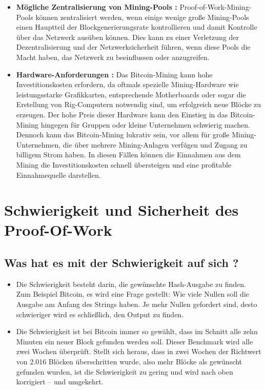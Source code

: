 \documentclass[ngerman]{scrreprt}
\begin{document}
\begin{itemize}
	\item \textbf{Mögliche Zentralisierung von Mining-Pools :} Proof-of-Work-Mining-Pools können zentralisiert werden, wenn einige wenige große Mining-Pools einen Hauptteil der Blockgenerierungsrate kontrollieren und damit Kontrolle über das Netzwerk ausüben können.  Dies kann zu einer Verletzung der Dezentralisierung und der Netzwerksicherheit führen, wenn diese Pools die Macht haben, das Netzwerk zu beeinflussen oder anzugreifen.
	
	\item \textbf{Hardware-Anforderungen :} Das Bitcoin-Mining kann hohe Investitionskosten erfordern, da oftmals spezielle Mining-Hardware wie leistungsstarke Grafikkarten, entsprechende Motherboards oder sogar die Erstellung von Rig-Computern notwendig sind, um erfolgreich neue Blöcke zu erzeugen. Der hohe Preis dieser Hardware kann den Einstieg in das Bitcoin-Mining hingegen für Gruppen oder kleine Unternehmen schwierig machen. Dennoch kann das Bitcoin-Mining lukrativ sein, vor allem für große Mining-Unternehmen, die über mehrere Mining-Anlagen verfügen und Zugang zu billigem Strom haben. In diesen Fällen können die Einnahmen aus dem Mining die Investitionskosten schnell übersteigen und eine profitable Einnahmequelle darstellen.
	
\end{itemize}

\chapter{Schwierigkeit und Sicherheit des Proof-Of-Work}

\section{Was hat es mit der Schwierigkeit auf sich ?}
\begin{itemize}
	\item{Die Schwierigkeit besteht darin, die gewünschte Hash-Ausgabe zu finden. Zum Beispiel Bitcoin, es wird eine Frage gestellt: Wie viele Nullen soll die Ausgabe am Anfang des Strings haben. Je mehr Nullen gefordert sind, desto schwieriger wird es schließlich, den Output zu finden. \cite{btc-echo-proof-of-work}}
	\item{Die Schwierigkeit ist bei Bitcoin immer so gewählt, dass im Schnitt alle zehn Minuten ein neuer Block gefunden werden soll. Dieser Benchmark wird alle zwei Wochen überprüft. Stellt sich heraus, dass in zwei Wochen der Richtwert von 2.016 Blöcken überschritten wurde, also mehr Blöcke als gewünscht gefunden wurden, ist die Schwierigkeit zu gering und wird nach oben korrigiert – und umgekehrt. \cite{btc-echo-proof-of-work}}
\end{itemize}
%
\end{document}
